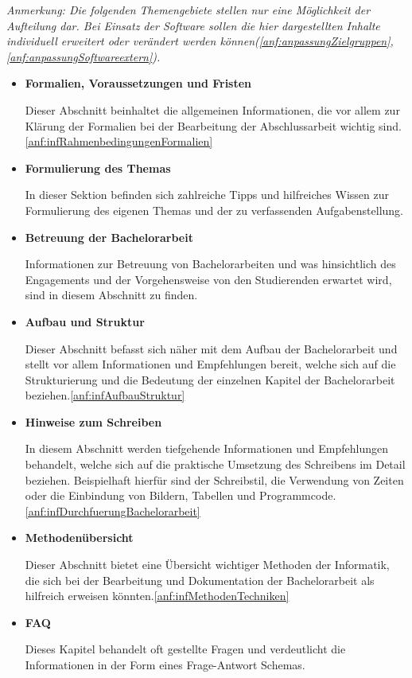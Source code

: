 \documentclass[bibliography=totoc,listof=totoc,BCOR=5mm,DIV=12,oneside]{scrbook}
\begin{document}
\par\bigskip \textit{Anmerkung: Die folgenden Themengebiete stellen nur eine Möglichkeit der Aufteilung dar. Bei Einsatz der Software sollen die hier dargestellten Inhalte individuell erweitert oder verändert werden können(\ref{anf:anpassungZielgruppen}, \ref{anf:anpassungSoftwareextern}).}

\begin{itemize}
\item \textbf{Formalien, Voraussetzungen und Fristen}
\par Dieser Abschnitt beinhaltet die allgemeinen Informationen, die vor allem zur Klärung der Formalien bei der Bearbeitung der Abschlussarbeit wichtig sind.\ref{anf:infRahmenbedingungenFormalien}

\item \textbf{Formulierung des Themas}
\par In dieser Sektion befinden sich zahlreiche Tipps und hilfreiches Wissen zur Formulierung des eigenen Themas und der zu verfassenden Aufgabenstellung.

\item \textbf{Betreuung der Bachelorarbeit}
\par Informationen zur Betreuung von Bachelorarbeiten und was hinsichtlich des Engagements und der Vorgehensweise von den Studierenden erwartet wird, sind in diesem Abschnitt zu finden.

\item \textbf{Aufbau und Struktur}
\par Dieser Abschnitt befasst sich näher mit dem Aufbau der Bachelorarbeit und stellt vor allem Informationen und Empfehlungen bereit, welche sich auf die Strukturierung und die Bedeutung der einzelnen Kapitel der Bachelorarbeit beziehen.\ref{anf:infAufbauStruktur}

\item \textbf{Hinweise zum Schreiben}
\par In diesem Abschnitt werden tiefgehende Informationen und Empfehlungen behandelt, welche sich auf die praktische Umsetzung des Schreibens im Detail beziehen. Beispielhaft hierfür sind der Schreibstil, die Verwendung von Zeiten oder die Einbindung von Bildern, Tabellen und Programmcode.\ref{anf:infDurchfuerungBachelorarbeit}

\item \textbf{Methodenübersicht}
\par Dieser Abschnitt bietet eine Übersicht wichtiger Methoden der Informatik, die sich bei der Bearbeitung und Dokumentation der Bachelorarbeit als hilfreich erweisen könnten.\ref{anf:infMethodenTechniken}

\item \textbf{FAQ}
\par Dieses Kapitel behandelt oft gestellte Fragen und verdeutlicht die Informationen in der Form eines Frage-Antwort Schemas.
\end{itemize}
\end{document}
